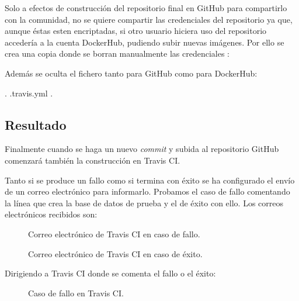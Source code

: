 Solo a efectos de construcción del repositorio final en GitHub para compartirlo con la comunidad, no se quiere compartir las credenciales del repositorio ya que, aunque éstas esten encriptadas, si otro usuario hiciera uso del repositorio accedería a la cuenta DockerHub, pudiendo subir nuevas imágenes. Por ello se crea una copia donde se borran manualmente las credenciales :


Además se oculta el fichero  tanto para GitHub como para DockerHub:

\begin{codelisting}
\label{code:scriptdocker}
\begin{code}
.
.travis.yml
.
\end{code}
\end{codelisting}

\subsection{Resultado}

Finalmente cuando se haga un nuevo \textit{commit} y subida al repositorio GitHub comenzará también la construcción en Travis CI.

Tanto si se produce un fallo como si termina con éxito se ha configurado el envío de un correo electrónico para informarlo. Probamos el caso de fallo comentando la línea que crea la base de datos de prueba  y el de éxito con ello. Los correos electrónicos recibidos son:

\begin{figure}[H]
\caption{Correo electrónico de Travis CI en caso de fallo.\label{fig:figure_placement_example}}
\end{figure}

\begin{figure}[H]
\caption{Correo electrónico de Travis CI en caso de éxito.\label{fig:figure_placement_example}}
\end{figure}

Dirigiendo a Travis CI donde se comenta el fallo o el éxito:

\begin{figure}[H]
\caption{Caso de fallo en Travis CI.\label{fig:figure_placement_example}}
\end{figure}


